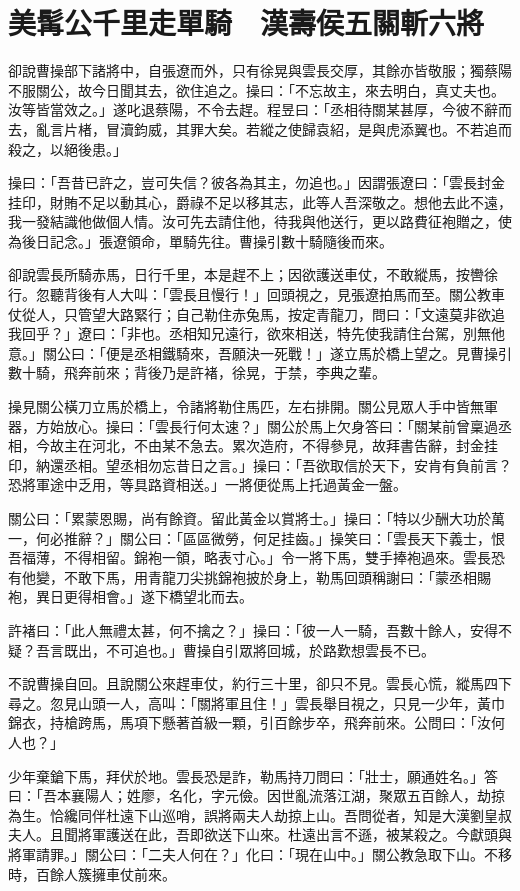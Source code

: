 
\chapter{美髯公千里走單騎　漢壽侯五關斬六將}

卻說曹操部下諸將中，自張遼而外，只有徐晃與雲長交厚，其餘亦皆敬服；獨蔡陽不服關公，故今日聞其去，欲住追之。操曰：「不忘故主，來去明白，真丈夫也。汝等皆當效之。」遂叱退蔡陽，不令去趕。程昱曰：「丞相待關某甚厚，今彼不辭而去，亂言片楮，冒瀆鈞威，其罪大矣。若縱之使歸袁紹，是與虎添翼也。不若追而殺之，以絕後患。」

操曰：「吾昔已許之，豈可失信？彼各為其主，勿追也。」因謂張遼曰：「雲長封金挂印，財賄不足以動其心，爵祿不足以移其志，此等人吾深敬之。想他去此不遠，我一發結識他做個人情。汝可先去請住他，待我與他送行，更以路費征袍贈之，使為後日記念。」張遼領命，單騎先往。曹操引數十騎隨後而來。

卻說雲長所騎赤馬，日行千里，本是趕不上；因欲護送車仗，不敢縱馬，按轡徐行。忽聽背後有人大叫：「雲長且慢行！」回頭視之，見張遼拍馬而至。關公教車仗從人，只管望大路緊行；自己勒住赤兔馬，按定青龍刀，問曰：「文遠莫非欲追我回乎？」遼曰：「非也。丞相知兄遠行，欲來相送，特先使我請住台駕，別無他意。」關公曰：「便是丞相鐵騎來，吾願決一死戰！」遂立馬於橋上望之。見曹操引數十騎，飛奔前來；背後乃是許褚，徐晃，于禁，李典之輩。

操見關公橫刀立馬於橋上，令諸將勒住馬匹，左右排開。關公見眾人手中皆無軍器，方始放心。操曰：「雲長行何太速？」關公於馬上欠身答曰：「關某前曾稟過丞相，今故主在河北，不由某不急去。累次造府，不得參見，故拜書告辭，封金挂印，納還丞相。望丞相勿忘昔日之言。」操曰：「吾欲取信於天下，安肯有負前言？恐將軍途中乏用，等具路資相送。」一將便從馬上托過黃金一盤。

關公曰：「累蒙恩賜，尚有餘資。留此黃金以賞將士。」操曰：「特以少酬大功於萬一，何必推辭？」關公曰：「區區微勞，何足挂齒。」操笑曰：「雲長天下義士，恨吾福薄，不得相留。錦袍一領，略表寸心。」令一將下馬，雙手捧袍過來。雲長恐有他變，不敢下馬，用青龍刀尖挑錦袍披於身上，勒馬回頭稱謝曰：「蒙丞相賜袍，異日更得相會。」遂下橋望北而去。

許褚曰：「此人無禮太甚，何不擒之？」操曰：「彼一人一騎，吾數十餘人，安得不疑？吾言既出，不可追也。」曹操自引眾將回城，於路歎想雲長不已。

不說曹操自回。且說關公來趕車仗，約行三十里，卻只不見。雲長心慌，縱馬四下尋之。忽見山頭一人，高叫：「關將軍且住！」雲長舉目視之，只見一少年，黃巾錦衣，持槍跨馬，馬項下懸著首級一顆，引百餘步卒，飛奔前來。公問曰：「汝何人也？」

少年棄鎗下馬，拜伏於地。雲長恐是詐，勒馬持刀問曰：「壯士，願通姓名。」答曰：「吾本襄陽人；姓廖，名化，字元儉。因世亂流落江湖，聚眾五百餘人，劫掠為生。恰纔同伴杜遠下山巡哨，誤將兩夫人劫掠上山。吾問從者，知是大漢劉皇叔夫人。且聞將軍護送在此，吾即欲送下山來。杜遠出言不遜，被某殺之。今獻頭與將軍請罪。」關公曰：「二夫人何在？」化曰：「現在山中。」關公教急取下山。不移時，百餘人簇擁車仗前來。

